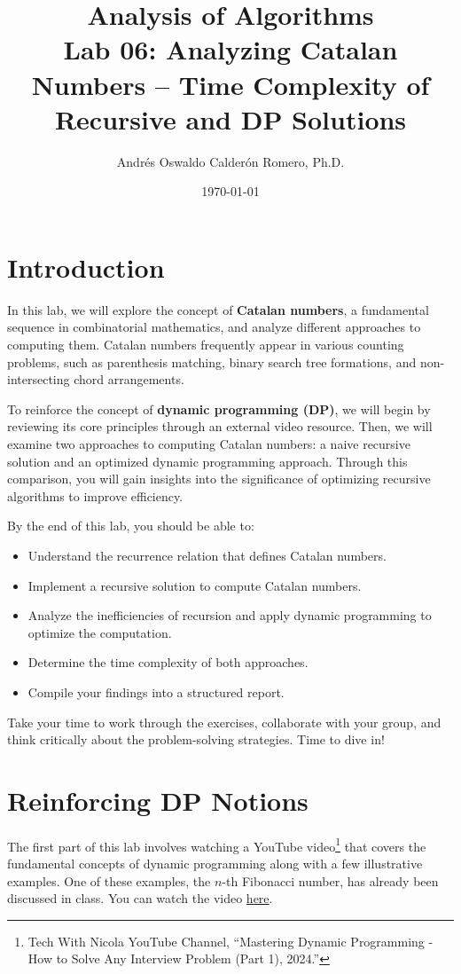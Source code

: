 \documentclass[12pt]{article}
\title{Analysis of Algorithms \\ Lab 06: Analyzing Catalan Numbers -- Time Complexity of Recursive and DP Solutions}
\author{Andrés Oswaldo Calderón Romero, Ph.D.}
\date{\today}
\begin{document}
\maketitle

\section{Introduction}

In this lab, we will explore the concept of \textbf{Catalan numbers}, a fundamental sequence in combinatorial mathematics, and analyze different approaches to computing them. Catalan numbers frequently appear in various counting problems, such as parenthesis matching, binary search tree formations, and non-intersecting chord arrangements.

To reinforce the concept of \textbf{dynamic programming (DP)}, we will begin by reviewing its core principles through an external video resource. Then, we will examine two approaches to computing Catalan numbers: a naive recursive solution and an optimized dynamic programming approach. Through this comparison, you will gain insights into the significance of optimizing recursive algorithms to improve efficiency.

By the end of this lab, you should be able to:
\begin{itemize}
    \item Understand the recurrence relation that defines Catalan numbers.
    \item Implement a recursive solution to compute Catalan numbers.
    \item Analyze the inefficiencies of recursion and apply dynamic programming to optimize the computation.
    \item Determine the time complexity of both approaches.
    \item Compile your findings into a structured report.
\end{itemize}

Take your time to work through the exercises, collaborate with your group, and think critically about the problem-solving strategies. Time to dive in!

\section{Reinforcing DP Notions}

The first part of this lab involves watching a YouTube video\footnote{Tech With Nicola YouTube Channel, ``Mastering Dynamic Programming - How to Solve Any Interview Problem (Part 1), 2024.''} that covers the fundamental concepts of dynamic programming along with a few illustrative examples. One of these examples, the $n$-th Fibonacci number, has already been discussed in class. You can watch the video \href{https://youtu.be/Hdr64lKQ3e4?si=PceRA6PHTYlSPlnE}{here}.
\end{document}
